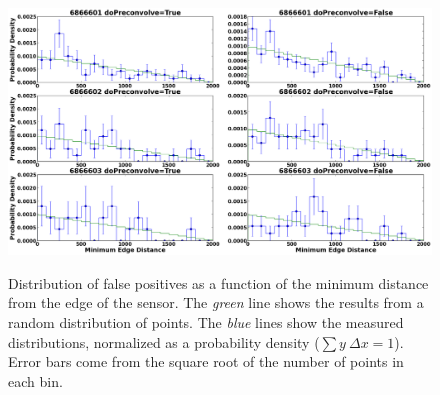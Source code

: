 \documentclass[prd, nofootinbib, floatfix, 11pt,tightenlines,times]{article}
\begin{document}
\begin{figure}
\includegraphics[width=1.0\textwidth]{figures/edge.eps} \\
\caption{Distribution of false positives as a function of the minimum
  distance from the edge of the sensor.  The {\it green} line shows
  the results from a random distribution of points.  The {\it blue}
  lines show the measured distributions, normalized as a probability
  density ($\sum y~\Delta x = 1$).  Error bars come from the square
  root of the number of points in each bin. }
\label{edgedist}
\end{figure}
\end{document}
